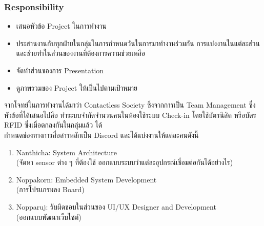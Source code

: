 \documentclass[fontsize=14pt]{extarticle}
\begin{document}
\subsubsection{Responsibility}
\begin{itemize}
    \item เสนอหัวข้อ Project ในการทำงาน
    \item ประสานงานกับทุกฝ่ายในกลุ่มในการกำหนดวันในการมาทำงานร่วมกัน การแบ่งงานในแต่ละส่วน และช่วยทำในส่วนของงานที่ต้องการความช่วยเหลือ
    \item จัดทำส่วนของการ Presentation
    \item ดูภาพรวมของ Project ให้เป็นไปตามเป้าหมาย
\end{itemize}
จากโจทย์ในการทำงานได้มาว่า Contactless Society ซึ่งจากการเป็น Team Management ซึ่งหัวข้อที่ได้เสนอไปคือ ทำระบบจำกัดจำนวนคนในห้องใช้ระบบ Check-in โดยใช้บัตรนิสิต หรือบัตร RFID ซึ่งเมื่อตกลงกันในกลุ่มแล้ว ได้ \\
กำหนดช่องทางการสื่อสารหลักเป็น Discord และได้แบ่งงานให้แต่ละคนดังนี้
\begin{enumerate}
    \item Nanthicha: System Architecture\\ (จัดหา sensor ต่าง ๆ ที่ต้องใช้ ออกแบบระบบว่าแต่ละอุปกรณ์เชื่อมต่อกันได้อย่างไร)
    \item Noppakorn: Embedded System Development \\ (การโปรแกรมลง Board)
    \item Nopparuj: รับผิดชอบในส่วนของ UI/UX Designer and Development\\ (ออกแบบพัฒนาเว็บไซต์)
\end{enumerate}
\end{document}
